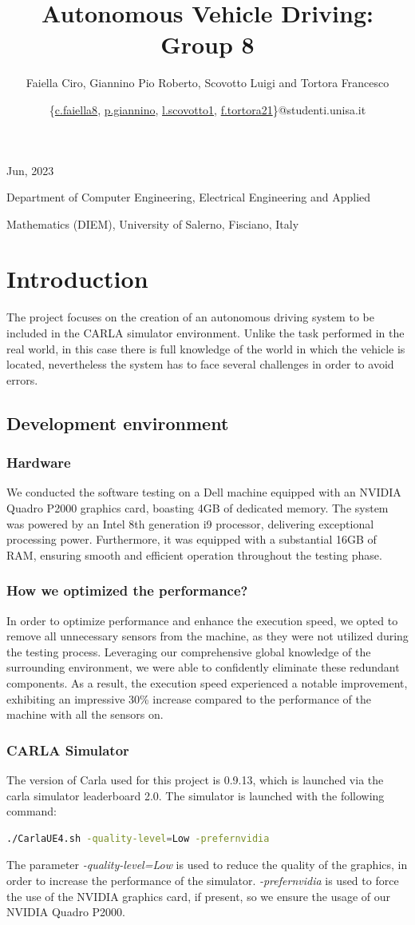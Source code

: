 \documentclass{article}
\title{\textbf{\myfont Autonomous Vehicle Driving: Group 8}}
\author{\small{Faiella Ciro, Giannino Pio Roberto, Scovotto Luigi and Tortora Francesco}}
\date{\small{\{\href{mailto:c.faiella8@studenti.unisa.it}{c.faiella8}, \href{mailto:p.giannino@studenti.unisa.it}{p.giannino}, \href{mailto:l.scovotto1@studenti.unisa.it}{l.scovotto1}, \href{mailto:f.tortora21@studenti.unisa.it}{f.tortora21}\}@studenti.unisa.it}}
\begin{document}
\maketitle
\centerline{\small{Jun, 2023}}
\centerline{Department of Computer Engineering, Electrical Engineering and Applied}
\centerline{Mathematics (DIEM), University of Salerno, Fisciano, Italy}
\newpage
\tableofcontents
\newpage
\section{Introduction}
The project focuses on the creation of an autonomous driving system to be included in the CARLA simulator 
environment. Unlike the task performed in the real world, in this case there is full knowledge of the world 
in which the vehicle is located, nevertheless the system has to face several challenges in order to avoid 
errors. 

\subsection{Development environment}
\subsubsection{Hardware}
We conducted the software testing on a Dell machine equipped with an NVIDIA Quadro P2000 graphics card, boasting 4GB of dedicated memory. 
The system was powered by an Intel 8th generation i9 processor, delivering exceptional processing power. Furthermore, it was equipped with a 
substantial 16GB of RAM, ensuring smooth and efficient operation throughout the testing phase.

\subsubsection{How we optimized the performance?}
In order to optimize performance and enhance the execution speed, we opted to remove all unnecessary sensors from the machine, 
as they were not utilized during the testing process. Leveraging our comprehensive global knowledge of the surrounding environment, 
we were able to confidently eliminate these redundant components. 
As a result, the execution speed experienced a notable improvement, exhibiting an impressive 30\% increase compared to the performance of
the machine with all the sensors on.

\subsubsection{CARLA Simulator}
The version of Carla used for this project is 0.9.13, which is launched via the carla simulator leaderboard 2.0.
The simulator is launched with the following command: 
\begin{lstlisting}[language=Bash]
    ./CarlaUE4.sh -quality-level=Low -prefernvidia
\end{lstlisting}
The parameter \textit{-quality-level=Low} is used to reduce the quality of the graphics, in order to increase the 
performance of the simulator. \textit{-prefernvidia} is used to force the use of the NVIDIA graphics card, if present, so we ensure the usage of our NVIDIA Quadro P2000.
\end{document}
